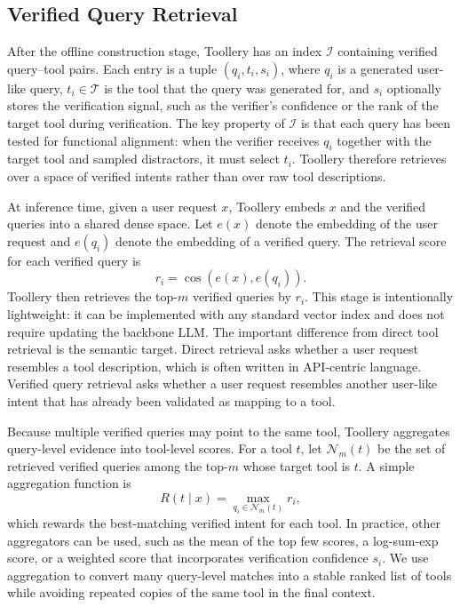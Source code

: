 \documentclass[11pt]{article}
\begin{document}
\subsection{Verified Query Retrieval}
\label{subsec:verified_query_retrieval}

After the offline construction stage, Toollery has an index $\mathcal{I}$ containing verified query--tool pairs. Each entry is a tuple $(q_i, t_i, s_i)$, where $q_i$ is a generated user-like query, $t_i \in \mathcal{T}$ is the tool that the query was generated for, and $s_i$ optionally stores the verification signal, such as the verifier's confidence or the rank of the target tool during verification. The key property of $\mathcal{I}$ is that each query has been tested for functional alignment: when the verifier receives $q_i$ together with the target tool and sampled distractors, it must select $t_i$. Toollery therefore retrieves over a space of verified intents rather than over raw tool descriptions.

At inference time, given a user request $x$, Toollery embeds $x$ and the verified queries into a shared dense space. Let $e(x)$ denote the embedding of the user request and $e(q_i)$ denote the embedding of a verified query. The retrieval score for each verified query is
\begin{equation}
    r_i = \cos(e(x), e(q_i)).
\end{equation}
Toollery then retrieves the top-$m$ verified queries by $r_i$. This stage is intentionally lightweight: it can be implemented with any standard vector index and does not require updating the backbone LLM. The important difference from direct tool retrieval is the semantic target. Direct retrieval asks whether a user request resembles a tool description, which is often written in API-centric language. Verified query retrieval asks whether a user request resembles another user-like intent that has already been validated as mapping to a tool.

Because multiple verified queries may point to the same tool, Toollery aggregates query-level evidence into tool-level scores. For a tool $t$, let $\mathcal{N}_m(t)$ be the set of retrieved verified queries among the top-$m$ whose target tool is $t$. A simple aggregation function is
\begin{equation}
    R(t \mid x) = \max_{q_i \in \mathcal{N}_m(t)} r_i,
\end{equation}
which rewards the best-matching verified intent for each tool. In practice, other aggregators can be used, such as the mean of the top few scores, a log-sum-exp score, or a weighted score that incorporates verification confidence $s_i$. We use aggregation to convert many query-level matches into a stable ranked list of tools while avoiding repeated copies of the same tool in the final context.
\end{document}

